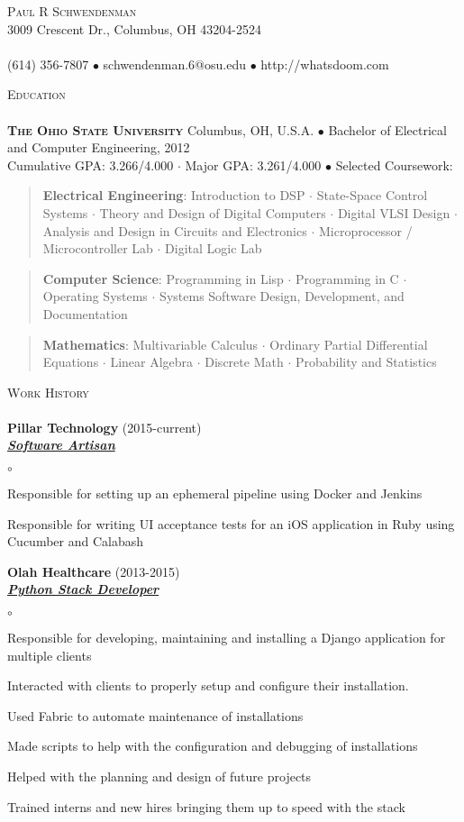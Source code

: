 \documentclass{article}
\newcommand{\area}[2]{\vspace*{-9pt} \begin{verse}\textbf{#1}:   #2 \end{verse}  }
\newcommand{\lineunder}{\vspace*{-8pt} \\ \hspace*{-18pt} \hrulefill \\}
\newcommand{\header}[1]{{\hspace*{-15pt}\vspace*{6pt} \textsc{#1}} \vspace*{-6pt} \lineunder}
\newcommand{\employer}[3]{{ \textbf{#1} (#2)\\ \underline{\textbf{\emph{#3}}}\\  }}
\newcommand{\contact}[3]{
\vspace*{-8pt}
\begin{center}
{\LARGE \scshape {#1}}\\
#2 \lineunder
#3
\end{center}
\vspace*{-8pt}
}
\newenvironment{achievements}{\begin{list}{$\circ$}{\topsep 0pt \itemsep -2pt}}{\vspace*{4pt}\end{list}}
\newcommand{\schoolwithcourses}[4]{
 \textbf{#1} #2 $\bullet$ #3\\
#4 $\bullet$  Selected Coursework:\\
\vspace*{5pt}
}
\begin{document}
\small
\smallskip
\vspace*{-44pt}

\contact{Paul R Schwendenman}
{3009 Crescent Dr., Columbus, OH 43204-2524}
{(614) 356-7807 $\bullet$ schwendenman.6@osu.edu  $\bullet$ http://whatsdoom.com}

\header{Education}

\schoolwithcourses{\textsc{The Ohio State University}}{Columbus, OH, U.S.A.}{Bachelor of Electrical and Computer Engineering, 2012}
{Cumulative GPA: 3.266/4.000 $\cdot$ Major GPA: 3.261/4.000}
	\area{Electrical Engineering}{Introduction to DSP $\cdot$ State-Space Control Systems $\cdot$ Theory and Design of Digital Computers $\cdot$
		Digital VLSI Design $\cdot$ Analysis and Design in Circuits and Electronics $\cdot$ Microprocessor / Microcontroller Lab $\cdot$ Digital Logic Lab}
	\area{Computer Science}{Programming in Lisp $\cdot$ Programming in C
		$\cdot$ Operating Systems $\cdot$ Systems Software Design, Development, and Documentation}
	\area{Mathematics}{Multivariable Calculus $\cdot$ Ordinary Partial Differential Equations $\cdot$ Linear Algebra $\cdot$ Discrete Math $\cdot$
		Probability and Statistics}



\header{Work History}
\employer{Pillar Technology}{2015-current}{Software Artisan}
	\begin{achievements}
	\item Responsible for setting up an ephemeral pipeline using Docker and Jenkins
	\item Responsible for writing UI acceptance tests for an iOS application in Ruby using Cucumber and Calabash
	\end{achievements}

\employer{Olah Healthcare}{2013-2015}{Python Stack Developer}
	\begin{achievements}
	\item Responsible for developing, maintaining and installing a Django application for multiple clients
	\item Interacted with clients to properly setup and configure their installation.
	\item Used Fabric to automate maintenance of installations
	\item Made scripts to help with the configuration and debugging of
	installations
	\item Helped with the planning and design of future projects
	\item Trained interns and new hires bringing them up to speed with
	the stack
	\end{achievements}
\end{document}
